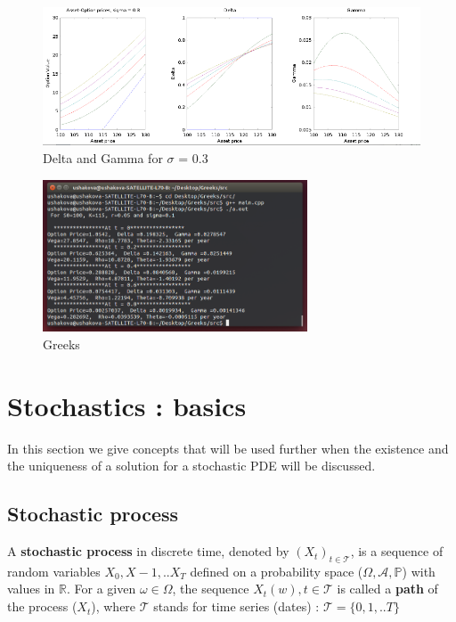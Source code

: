 \documentclass[a4paper]{report}
\begin{document}
\begin{itemize}
\begin{figure}[H]
    \centering
    \includegraphics[width=\textwidth]{octave2.png}
    \caption{Delta and Gamma for $\sigma$ = 0.3}
\end{figure}

\begin{figure}[H]
    \left
    \includegraphics[width=0.7\textwidth]{gpp.png}
    \caption{ Greeks }
\end{figure}


\chapter{Stochastics : basics}
In this section we give concepts that will be used further when the existence and the uniqueness of a solution for a stochastic PDE will be discussed.

\section{Stochastic process}


A \textbf{stochastic process} in discrete time, denoted by $(X_t)_{t \in \mathcal{T}}$, is a sequence of random variables $X_0,X-1,..X_T$ defined on a probability space ($\Omega, \mathcal{A}, \mathbb{P}$) with values in $\mathbb{R}$. For a given $\omega \in \Omega$, the sequence $X_t(w), t\in \mathcal{T}$ is called a \textbf{path} of the process ($X_t$), where $\mathcal{T}$ stands for time series (dates) : $\mathcal{T}=\{0,1,..T\}$
\\


\end{itemize}
\end{document}
